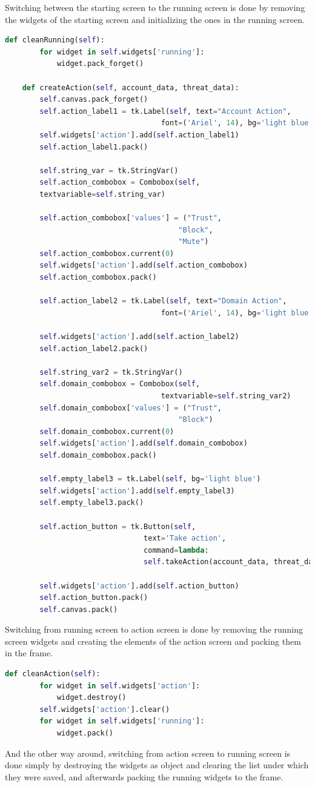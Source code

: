 Switching between the starting screen to the running screen is done by removing the widgets of the starting screen and initializing
the ones in the running screen.
\begin{lstlisting}[language=python, caption={Switching from running screen to action screen}, captionpos=b]
	 def cleanRunning(self):
		for widget in self.widgets['running']:
			widget.pack_forget()
	
	def createAction(self, account_data, threat_data):
		self.canvas.pack_forget()
		self.action_label1 = tk.Label(self, text="Account Action", 
									font=('Ariel', 14), bg='light blue')
		self.widgets['action'].add(self.action_label1)
		self.action_label1.pack()
		
		self.string_var = tk.StringVar()
		self.action_combobox = Combobox(self, 
		textvariable=self.string_var)
		
		self.action_combobox['values'] = ("Trust", 
										"Block",
										"Mute")
		self.action_combobox.current(0)
		self.widgets['action'].add(self.action_combobox)
		self.action_combobox.pack()
		
		self.action_label2 = tk.Label(self, text="Domain Action", 
									font=('Ariel', 14), bg='light blue')
		
		self.widgets['action'].add(self.action_label2)
		self.action_label2.pack()
		
		self.string_var2 = tk.StringVar()
		self.domain_combobox = Combobox(self, 
									textvariable=self.string_var2)
		self.domain_combobox['values'] = ("Trust", 
										"Block")
		self.domain_combobox.current(0)
		self.widgets['action'].add(self.domain_combobox)
		self.domain_combobox.pack()
		
		self.empty_label3 = tk.Label(self, bg='light blue')
		self.widgets['action'].add(self.empty_label3)
		self.empty_label3.pack()
		
		self.action_button = tk.Button(self, 
								text='Take action', 
								command=lambda:
								self.takeAction(account_data, threat_data))
		
		self.widgets['action'].add(self.action_button)
		self.action_button.pack()
		self.canvas.pack()
\end{lstlisting}
Switching from running screen to action screen is done by removing the running screen widgets and creating the elements 
of the action screen and packing them in the frame.
\begin{lstlisting}[language=python, caption={Switching from action screen to running screen}, captionpos=b]
	def cleanAction(self):
		for widget in self.widgets['action']:
			widget.destroy()
		self.widgets['action'].clear()
		for widget in self.widgets['running']:
			widget.pack()
\end{lstlisting}
And the other way around, switching from action screen to running screen is done simply by destroying the widgets as object and clearing the list
under which they were saved, and afterwards packing the running widgets to the frame.
